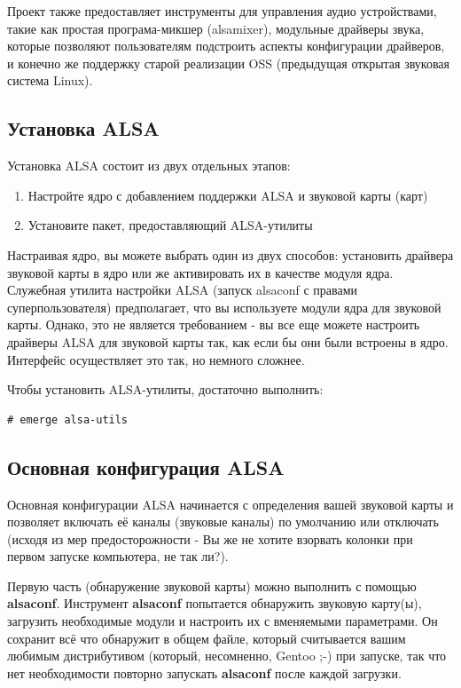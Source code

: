 \documentclass[10pt]{book}
\begin{document}
Проект также предоставляет инструменты для управления аудио устройствами, такие как простая програма-микшер (alsamixer), модульные драйверы звука, которые позволяют пользователям подстроить аспекты конфигурации драйверов, и конечно же поддержку старой реализации OSS (предыдущая открытая звуковая система Linux).

\subsection{Установка ALSA}
Установка ALSA состоит из двух отдельных этапов:
\begin{enumerate}
\item Настройте ядро с добавлением поддержки ALSA и звуковой карты (карт)
\item Установите пакет, предоставляющий ALSA-утилиты
\end{enumerate}

Настраивая ядро, вы можете выбрать один из двух способов: установить драйвера звуковой карты в ядро или же активировать их в качестве модуля ядра. Служебная утилита настройки ALSA (запуск alsaconf с правами суперпользователя) предполагает, что вы используете модули ядра для звуковой карты. Однако, это не является требованием - вы все еще можете настроить драйверы ALSA для звуковой карты так, как если бы они были встроены в ядро. Интерфейс осуществляет это так, но немного сложнее.

Чтобы установить ALSA-утилиты, достаточно выполнить:

\begin{tcolorbox}
\begin{lstlisting}
# emerge alsa-utils
\end{lstlisting}
\end{tcolorbox}

\subsection{Основная конфигурация ALSA}
Основная конфигурации ALSA начинается с определения вашей звуковой карты и позволяет включать её каналы (звуковые каналы) по умолчанию или отключать (исходя из мер предосторожности - Вы же не хотите взорвать колонки при первом запуске компьютера, не так ли?). 

Первую часть (обнаружение звуковой карты) можно выполнить с помощью \textbf{alsaconf}. Инструмент \textbf{alsaconf} попытается обнаружить звуковую карту(ы), загрузить необходимые модули и настроить их с вменяемыми параметрами. Он сохранит всё что обнаружит в общем файле, который считывается вашим любимым дистрибутивом (который, несомненно, Gentoo ;-) при запуске, так что нет необходимости повторно запускать \textbf{alsaconf} после каждой загрузки.
\end{document}
